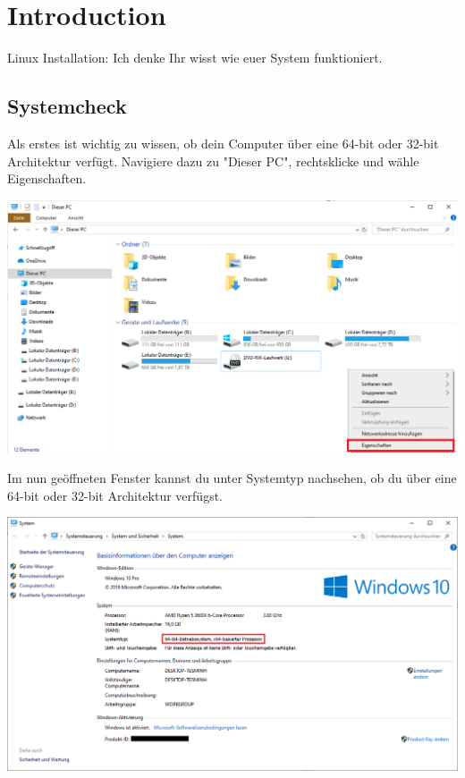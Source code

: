 \documentclass{scrartcl}
\begin{document}
\section{Introduction}
Linux Installation: Ich denke Ihr wisst wie euer System funktioniert.

\subsection{Systemcheck}
Als erstes ist wichtig zu wissen, ob dein Computer über eine 64-bit oder 32-bit Architektur verfügt. Navigiere dazu zu "Dieser PC", rechtsklicke und wähle Eigenschaften.

\begin{center}
    \includegraphics[width=.9\textwidth]{Screenshot_1.png}
\end{center}
    
Im nun geöffneten Fenster kannst du unter Systemtyp nachsehen, ob du über eine 64-bit oder 32-bit Architektur verfügst.\\
\begin{center}
    \includegraphics[width=.9\textwidth]{Screenshot_2.png}
\end{center}
\end{document}
